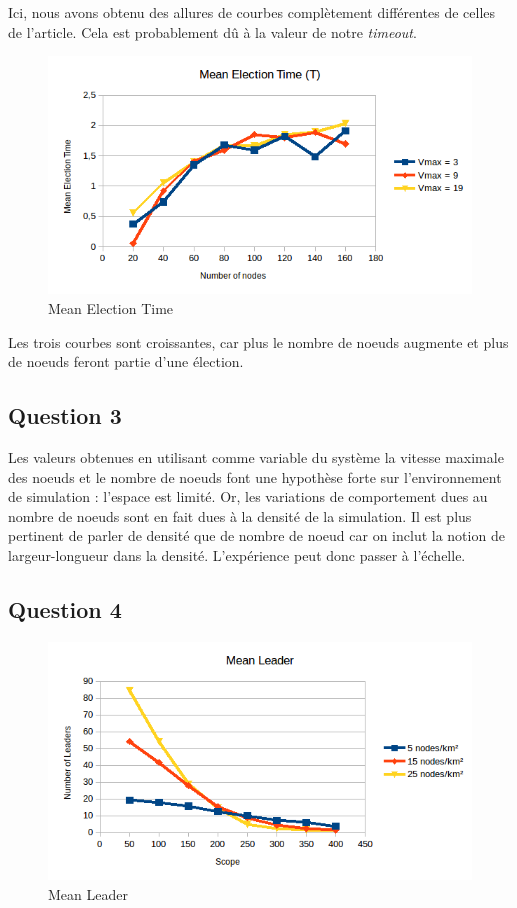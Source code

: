 \documentclass[paper=a4, fontsize=11pt]{article} %
\begin{document}
Ici, nous avons obtenu des allures de courbes complètement différentes de celles de l'article. Cela est probablement dû à la valeur de notre \textit{timeout}.

\begin{figure}[!h]
\centering
\includegraphics[width=\textwidth]{mean_election_time.png}
\caption{Mean Election Time}
\label{MET}
\end{figure}

Les trois courbes sont croissantes, car plus le nombre de noeuds augmente et plus de noeuds feront partie d'une élection.

\subsection{Question 3}
Les valeurs obtenues en utilisant comme variable du système la vitesse maximale des noeuds et le nombre de noeuds font une hypothèse forte sur l'environnement de simulation : l'espace est limité. Or, les variations de comportement dues au nombre de noeuds sont en fait dues à la densité de la simulation. 
Il est plus pertinent de parler de densité que de nombre de noeud car on inclut la notion de largeur-longueur dans la densité. L'expérience peut donc passer à l'échelle.

\subsection{Question 4}

\begin{figure}[!h]
\centering
\includegraphics[width=\textwidth]{mean_leader.png}
\caption{Mean Leader}
\label{ML}
\end{figure}
\end{document}
